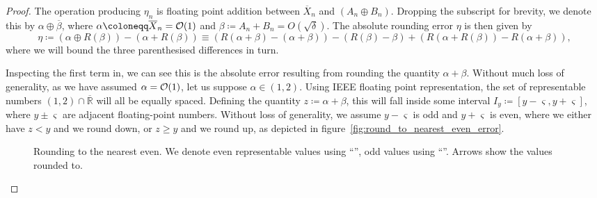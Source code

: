 \documentclass[manuscript,review]{acmart}
\begin{document}
\begin{proof}
The operation producing $ \eta_n $ is floating point addition between $ \overline{X}_n $ and $ (A_n \oplus B_n) $.  Dropping the subscript for brevity, we denote this by $ \alpha \oplus \overline{\beta} $, where $ \alpha \coloneqq  \overline{X}_n = \order{1} $ and   $ \beta \coloneqq A_n + B_n = O(\sqrt{\delta}) $. The absolute rounding error $ \eta $ is then given by 
\begin{equation*}
\label{eqt:absolute_rounding_errors_decomposition_for_floating_point_addition}
\eta \coloneqq (\alpha \oplus R(\beta)) - (\alpha + R(\beta)) \equiv (R(\alpha + \beta) - (\alpha + \beta)) - (R(\beta) - \beta) +  (R(\alpha + R(\beta)) - R(\alpha + \beta)), 
\end{equation*}
where we will bound the three parenthesised differences in turn. 

Inspecting the first term in, we can see this is the absolute error resulting from rounding the quantity $ \alpha + \beta $. Without much loss of generality, as we have assumed $ \alpha = \order{1} $, let us suppose $ \alpha \in (1, 2) $. Using IEEE floating point representation, the set of representable numbers $ (1, 2) \cap \overline{\mathbb{R}} $ will all be equally spaced. Defining the quantity $ z \coloneqq \alpha + \beta $, this will fall inside some interval $I_y \coloneqq [y-\varsigma, y + \varsigma] $, where $ y\pm\varsigma $ are adjacent floating-point numbers. Without loss of generality, we assume $ y - \varsigma $ is odd and $ y + \varsigma $ is even, where we either have $ z < y $ and we round down, or $ z \geq y $ and we round up, as depicted in figure~\ref{fig:round_to_nearest_even_error}.

\begin{figure}[htb]
\centering
{}
\caption{Rounding to the nearest even. We denote even representable values using ``\raisebox{-0.25em}{\Huge$ \bullet $}'', odd values using ``\raisebox{0.05em}{$ \bigcirc $}''. Arrows show the values rounded to.}
\label{fig:round_to_nearest_even}
\end{figure}


\end{proof}
\end{document}
